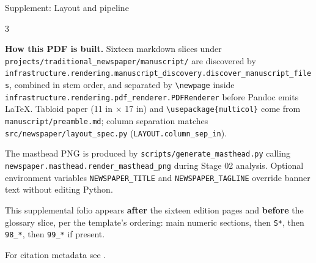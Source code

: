 \documentclass[
  ignorenonframetext,
]{beamer}
\author{\texorpdfstring{}{}}
\date{}
\begin{document}
\begin{frame}[fragile]{Supplement: Layout and pipeline}
\protect{}\label{supplement-layout-and-pipeline}
\begin{multicols}{3}

\textbf{How this PDF is built.} Sixteen markdown slices under
\texttt{projects/traditional\_newspaper/manuscript/} are discovered by
\texttt{infrastructure.rendering.manuscript\_discovery.discover\_manuscript\_files},
combined in stem order, and separated by
\texttt{\textbackslash{}newpage} inside
\texttt{infrastructure.rendering.pdf\_renderer.PDFRenderer} before
Pandoc emits LaTeX. Tabloid paper (11 in × 17 in) and
\texttt{\textbackslash{}usepackage\{multicol\}} come from
\texttt{manuscript/preamble.md}; column separation matches
\texttt{src/newspaper/layout\_spec.py}
(\texttt{LAYOUT.column\_sep\_in}).

The masthead PNG is produced by \texttt{scripts/generate\_masthead.py}
calling \texttt{newspaper.masthead.render\_masthead\_png} during Stage
02 analysis. Optional environment variables \texttt{NEWSPAPER\_TITLE}
and \texttt{NEWSPAPER\_TAGLINE} override banner text without editing
Python.

This supplemental folio appears \textbf{after} the sixteen edition pages
and \textbf{before} the glossary slice, per the template's ordering:
main numeric sections, then \texttt{S*}, then \texttt{98\_*}, then
\texttt{99\_*} if present.

\noindent For citation metadata see \cite{template2026gazette}.
\par\smallskip

\end{multicols}
\end{frame}
\end{document}
